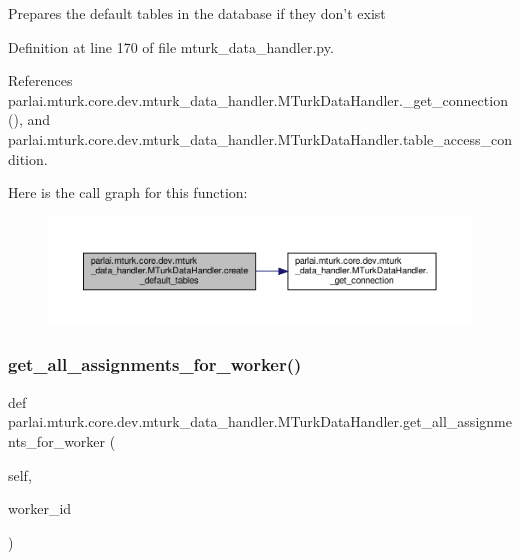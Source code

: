 \begin{DoxyVerb}Prepares the default tables in the database if they don't exist\end{DoxyVerb}
 

Definition at line 170 of file mturk\+\_\+data\+\_\+handler.\+py.



References parlai.\+mturk.\+core.\+dev.\+mturk\+\_\+data\+\_\+handler.\+M\+Turk\+Data\+Handler.\+\_\+get\+\_\+connection(), and parlai.\+mturk.\+core.\+dev.\+mturk\+\_\+data\+\_\+handler.\+M\+Turk\+Data\+Handler.\+table\+\_\+access\+\_\+condition.

Here is the call graph for this function\+:
\nopagebreak
\begin{figure}[H]
\begin{center}
\leavevmode
\includegraphics[width=350pt]{classparlai_1_1mturk_1_1core_1_1dev_1_1mturk__data__handler_1_1MTurkDataHandler_a08e9ad4daabe8117c158b0c2a986f6f1_cgraph}
\end{center}
\end{figure}
\mbox{\label{classparlai_1_1mturk_1_1core_1_1dev_1_1mturk__data__handler_1_1MTurkDataHandler_a46feee52b8950688e8d916dcd263d2c1}} 
\subsubsection{\texorpdfstring{get\+\_\+all\+\_\+assignments\+\_\+for\+\_\+worker()}{get\_all\_assignments\_for\_worker()}}
{\footnotesize\ttfamily def parlai.\+mturk.\+core.\+dev.\+mturk\+\_\+data\+\_\+handler.\+M\+Turk\+Data\+Handler.\+get\+\_\+all\+\_\+assignments\+\_\+for\+\_\+worker (\begin{DoxyParamCaption}\item[{}]{self,  }\item[{}]{worker\+\_\+id }\end{DoxyParamCaption})}

